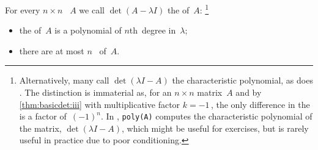 \begin{theorem} \label{thm:geecp}
For every \(n\times n\) ~\(A\) we call \(\det(A-\lambda I)\) the  of~\(A\):%
\footnote{Alternatively, many call \(\det(\lambda I-A)\) the characteristic polynomial, as does \script.  
The distinction is immaterial as,  for an \(n\times n\) matrix~\(A\) and by \cref{thm:basicdet:iii} with multiplicative factor \(k=-1\)\,, the only difference in the  is a factor of~\((-1)^n\).
In \script, \texttt{poly(A)} computes the characteristic polynomial of the matrix,  \(\det(\lambda I-A)\), which might be useful for exercises, but is rarely useful in practice due to poor conditioning.}
\begin{itemize}
\item the  of~\(A\) is a polynomial of \(n\)th~degree in~\(\lambda\);
\item  there are at most \(n\)~ of~\(A\).
\end{itemize}
\end{theorem}

